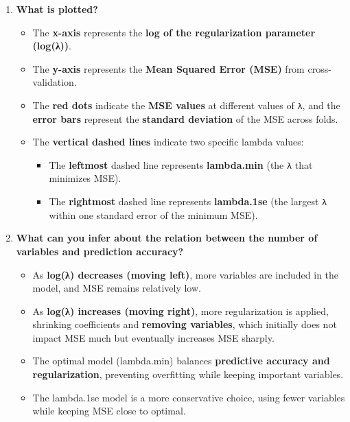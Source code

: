 \documentclass[
]{article}
\begin{document}
\begin{enumerate}
\def\labelenumi{\arabic{enumi}.}
\item
  \textbf{What is plotted?}

  \begin{itemize}
  \item
    The \textbf{x-axis} represents the \textbf{log of the regularization
    parameter (log(λ))}.
  \item
    The \textbf{y-axis} represents the \textbf{Mean Squared Error (MSE)}
    from cross-validation.
  \item
    The \textbf{red dots} indicate the \textbf{MSE values} at different
    values of \texttt{λ}, and the \textbf{error bars} represent the
    \textbf{standard deviation} of the MSE across folds.
  \item
    The \textbf{vertical dashed lines} indicate two specific lambda
    values:

    \begin{itemize}
    \item
      The \textbf{leftmost} dashed line represents \textbf{lambda.min}
      (the \texttt{λ} that minimizes MSE).
    \item
      The \textbf{rightmost} dashed line represents \textbf{lambda.1se}
      (the largest \texttt{λ} within one standard error of the minimum
      MSE).
    \end{itemize}
  \end{itemize}
\item
  \textbf{What can you infer about the relation between the number of
  variables and prediction accuracy?}

  \begin{itemize}
  \item
    As \textbf{log(λ) decreases (moving left)}, more variables are
    included in the model, and MSE remains relatively low.
  \item
    As \textbf{log(λ) increases (moving right)}, more regularization is
    applied, shrinking coefficients and \textbf{removing variables},
    which initially does not impact MSE much but eventually increases
    MSE sharply.
  \item
    The optimal model (lambda.min) balances \textbf{predictive accuracy
    and regularization}, preventing overfitting while keeping important
    variables.
  \item
    The lambda.1se model is a more conservative choice, using fewer
    variables while keeping MSE close to optimal.
  \end{itemize}
\end{enumerate}
\end{document}
